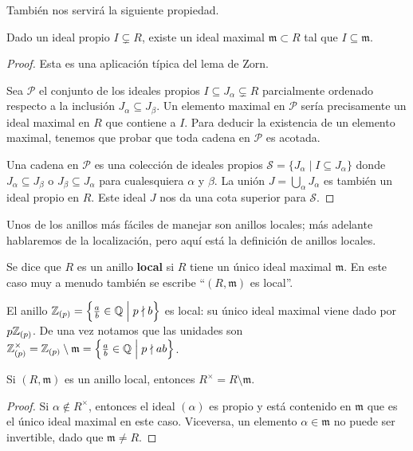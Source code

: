 También nos servirá la siguiente propiedad.

\begin{proposicion}
  Dado un ideal propio $I \subsetneq R$, existe un ideal maximal
  $\mathfrak{m} \subset R$ tal que $I \subseteq \mathfrak{m}$.

  \begin{proof}
    Esta es una aplicación típica del lema de Zorn.

    Sea $\mathcal{P}$ el conjunto de los ideales propios
    $I \subseteq J_\alpha \subsetneq R$ parcialmente ordenado respecto a la
    inclusión $J_\alpha \subseteq J_\beta$. Un elemento maximal en $\mathcal{P}$
    sería precisamente un ideal maximal en $R$ que contiene a $I$. Para deducir
    la existencia de un elemento maximal, tenemos que probar que toda cadena en
    $\mathcal{P}$ es acotada.

    Una cadena en $\mathcal{P}$ es una colección de ideales propios
    $\mathcal{S} = \{ J_\alpha \mid I \subseteq J_\alpha \}$ donde
    $J_\alpha \subseteq J_\beta$ o $J_\beta \subseteq J_\alpha$ para
    cualesquiera $\alpha$ y $\beta$. La unión $J = \bigcup_\alpha J_\alpha$ es
    también un ideal propio en $R$. Este ideal $J$ nos da una cota superior para
    $\mathcal{S}$.
  \end{proof}
\end{proposicion}

Unos de los anillos más fáciles de manejar son anillos locales; más adelante
hablaremos de la localización, pero aquí está la definición de anillos locales.

\begin{definicion}
  Se dice que $R$ es un anillo \textbf{local} si $R$ tiene un único ideal
  maximal $\mathfrak{m}$. En este caso muy a menudo también se escribe
  ``$(R,\mathfrak{m})$ es local''.
\end{definicion}

\begin{ejemplo}
  El anillo
  $\mathbb{Z}_{(p)} = \Bigl\{ \frac{a}{b} \in \mathbb{Q} \Bigm| p\nmid b \Bigr\}$
  es local: su único ideal maximal viene dado por $p\mathbb{Z}_{(p)}$.
  De una vez notamos que las unidades son
  $\mathbb{Z}_{(p)}^\times = \mathbb{Z}_{(p)}\setminus\mathfrak{m} = \Bigl\{ \frac{a}{b} \in \mathbb{Q} \Bigm| p\nmid ab \Bigr\}$.
\end{ejemplo}

\begin{proposicion}
  Si $(R, \mathfrak{m})$ es un anillo local, entonces
  $R^\times = R\setminus \mathfrak{m}$.

  \begin{proof}
    Si $\alpha \notin R^\times$, entonces el ideal $(\alpha)$ es propio
    y está contenido en $\mathfrak{m}$ que es el único ideal maximal en este
    caso. Viceversa, un elemento $\alpha \in \mathfrak{m}$ no puede ser
    invertible, dado que $\mathfrak{m} \ne R$.
  \end{proof}
\end{proposicion}


